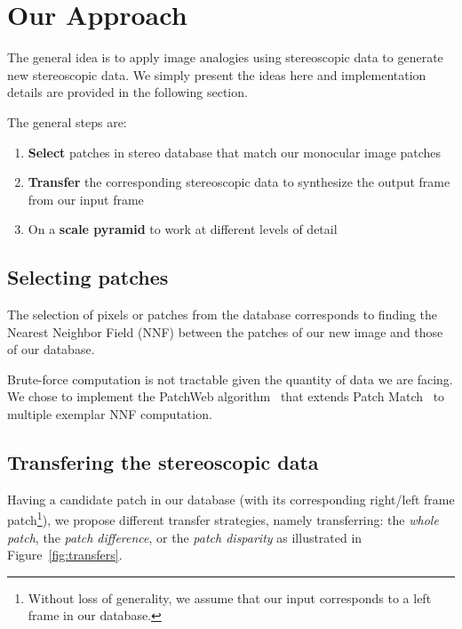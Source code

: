 
\section{Our Approach}

The general idea is to apply image analogies using stereoscopic data to generate new stereoscopic data.
We simply present the ideas here and implementation details are provided in the following section.

The general steps are:
\begin{enumerate}
	\item \textbf{Select} patches in stereo database that match our monocular image patches
	\item \textbf{Transfer} the corresponding stereoscopic data to synthesize the output frame from our input frame
	\item On a \textbf{scale pyramid} to work at different levels of detail
\end{enumerate}

\subsection{Selecting patches}
The selection of pixels or patches from the database corresponds to finding the Nearest Neighbor Field (NNF) between the patches of our new image and those of our database.

Brute-force computation is not tractable given the quantity of data we are facing.
We chose to implement the PatchWeb algorithm~\cite{Barnes11} that extends Patch Match~\cite{Barnes09} to multiple exemplar NNF computation.

\subsection{Transfering the stereoscopic data}
Having a candidate patch in our database (with its corresponding right/left frame patch\footnote{Without loss of generality, we assume that our input corresponds to a left frame in our database.}), we propose different transfer strategies, namely transferring: the \emph{whole patch}, the \emph{patch difference}, or the \emph{patch disparity} as illustrated in Figure~\ref{fig:transfers}.

